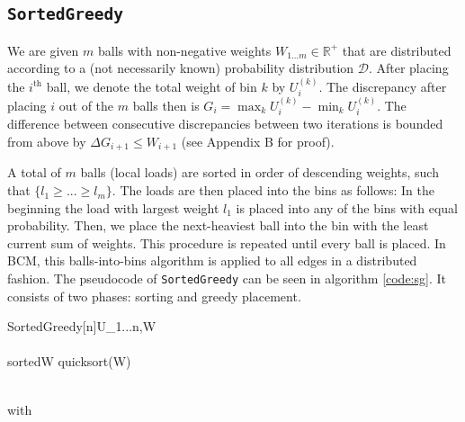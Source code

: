 \documentclass[12pt,psfig,a4]{article}
\newcommand{\sg}{\texttt{SortedGreedy}}
\theoremstyle{plain}
\begin{document}
\subsection{\texttt{SortedGreedy}}
We are given $m$ balls with non-negative weights $W_{1\ldots m} \in \mathbb{R}^+$ that are distributed according to a (not necessarily known) probability distribution $\mathcal{D}$. After placing the $i^{\text{th}}$ ball, we denote the total weight of bin $k$ by $U_i^{(k)}$. The discrepancy after placing $i$ out of the $m$ balls then is $G_i=\max_{k}U_i^{(k)} - \min_{k} U_i^{(k)}$. The difference between consecutive discrepancies between two iterations is bounded from above by $\Delta G_{i+1} \leq W_{i+1}$ (see Appendix B for proof).

A total of $m$ balls (local loads) are sorted in order of descending weights, such that $\{l_1\geq ... \geq l_m\}$. The loads are then placed into the bins as follows: In the beginning the load with largest weight $l_1$ is placed into any of the bins with equal probability. Then, we place the next-heaviest ball into the bin with the least current sum of weights. This procedure is repeated until every ball is placed. In BCM, this balls-into-bins algorithm is applied to all edges in a distributed fashion. The pseudocode of \sg{} can be seen in algorithm \ref{code:sg}. It consists of two phases: sorting and greedy placement. \\

\begin{pseudocode}[framebox]{SortedGreedy[n]}{U_{1...n},W}
	 \\
   	 \\
   	sortedW \GETS quicksort(W)  \\
	 \\
	\label{code:sg}
  \end{pseudocode}

with
\end{document}
